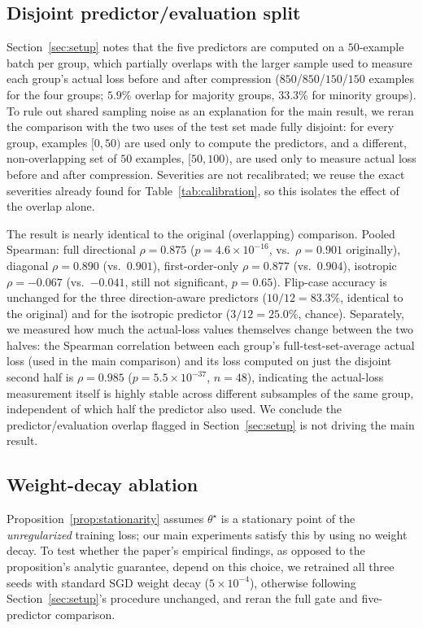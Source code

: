 \documentclass{article}
\newcommand{\theorig}{\theta^\star}
\begin{document}
\subsection{Disjoint predictor/evaluation split}
\label{app:disjoint-split}

Section~\ref{sec:setup} notes that the five predictors are computed on a $50$-example batch per group, which partially overlaps with the larger sample used to measure each group's actual loss before and after compression ($850$/$850$/$150$/$150$ examples for the four groups; $5.9\%$ overlap for majority groups, $33.3\%$ for minority groups). To rule out shared sampling noise as an explanation for the main result, we reran the comparison with the two uses of the test set made fully disjoint: for every group, examples $[0,50)$ are used only to compute the predictors, and a different, non-overlapping set of $50$ examples, $[50,100)$, are used only to measure actual loss before and after compression. Severities are not recalibrated; we reuse the exact severities already found for Table~\ref{tab:calibration}, so this isolates the effect of the overlap alone.

The result is nearly identical to the original (overlapping) comparison. Pooled Spearman: full directional $\rho=0.875$ ($p=4.6\times10^{-16}$, vs.\ $\rho=0.901$ originally), diagonal $\rho=0.890$ (vs.\ $0.901$), first-order-only $\rho=0.877$ (vs.\ $0.904$), isotropic $\rho=-0.067$ (vs.\ $-0.041$, still not significant, $p=0.65$). Flip-case accuracy is unchanged for the three direction-aware predictors ($10/12=83.3\%$, identical to the original) and for the isotropic predictor ($3/12=25.0\%$, chance). Separately, we measured how much the actual-loss values themselves change between the two halves: the Spearman correlation between each group's full-test-set-average actual loss (used in the main comparison) and its loss computed on just the disjoint second half is $\rho=0.985$ ($p=5.5\times10^{-37}$, $n=48$), indicating the actual-loss measurement itself is highly stable across different subsamples of the same group, independent of which half the predictor also used. We conclude the predictor/evaluation overlap flagged in Section~\ref{sec:setup} is not driving the main result.

\subsection{Weight-decay ablation}
\label{app:weight-decay}

Proposition~\ref{prop:stationarity} assumes $\theorig$ is a stationary point of the \emph{unregularized} training loss; our main experiments satisfy this by using no weight decay. To test whether the paper's empirical findings, as opposed to the proposition's analytic guarantee, depend on this choice, we retrained all three seeds with standard SGD weight decay ($5\times10^{-4}$), otherwise following Section~\ref{sec:setup}'s procedure unchanged, and reran the full gate and five-predictor comparison.
\end{document}
